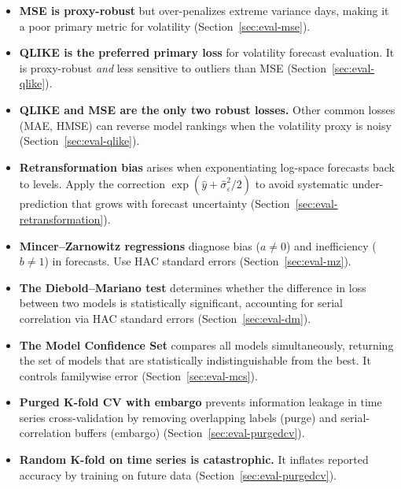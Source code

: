 \begin{itemize}[nosep]
  \item \textbf{MSE is proxy-robust} but over-penalizes extreme variance days, making it a poor primary metric for volatility (Section~\ref{sec:eval-mse}).

  \item \textbf{QLIKE is the preferred primary loss} for volatility forecast evaluation. It is proxy-robust \emph{and} less sensitive to outliers than MSE \citep{Patton2011} (Section~\ref{sec:eval-qlike}).

  \item \textbf{QLIKE and MSE are the only two robust losses.} Other common losses (MAE, HMSE) can reverse model rankings when the volatility proxy is noisy (Section~\ref{sec:eval-qlike}).

  \item \textbf{Retransformation bias} arises when exponentiating log-space forecasts back to levels. Apply the correction $\exp(\hat{y} + \hat{\sigma}^2_\varepsilon/2)$ to avoid systematic under-prediction that grows with forecast uncertainty \citep{Patton2011} (Section~\ref{sec:eval-retransformation}).

  \item \textbf{Mincer--Zarnowitz regressions} diagnose bias ($a \neq 0$) and inefficiency ($b \neq 1$) in forecasts. Use HAC standard errors (Section~\ref{sec:eval-mz}).

  \item \textbf{The Diebold--Mariano test} determines whether the difference in loss between two models is statistically significant, accounting for serial correlation via HAC standard errors \citep{DieboldMariano1995} (Section~\ref{sec:eval-dm}).

  \item \textbf{The Model Confidence Set} compares all models simultaneously, returning the set of models that are statistically indistinguishable from the best. It controls familywise error \citep{HansenLundeNason2011} (Section~\ref{sec:eval-mcs}).

  \item \textbf{Purged K-fold CV with embargo} prevents information leakage in time series cross-validation by removing overlapping labels (purge) and serial-correlation buffers (embargo) \citep{LopezdePrado2018} (Section~\ref{sec:eval-purgedcv}).

  \item \textbf{Random K-fold on time series is catastrophic.} It inflates reported accuracy by training on future data (Section~\ref{sec:eval-purgedcv}).


\end{itemize}
